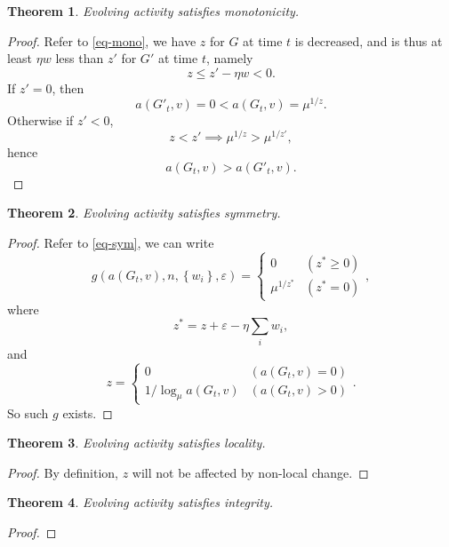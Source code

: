 \documentclass[12pt,abstract=true]{scrartcl}
\numberwithin{equation}{section}
\theoremstyle{definition}   \newtheorem{definition}{Definition}[section]
\theoremstyle{plain}        \newtheorem{theorem}{Theorem}[section]
\theoremstyle{plain}        \newtheorem{observation}{Observation}[section]
\theoremstyle{plain}        \newtheorem{fact}{Fact}[section]
\theoremstyle{plain}        \newtheorem{claim}{Claim}[section]
\theoremstyle{plain}        \newtheorem{lemma}[theorem]{Lemma}
\theoremstyle{plain}        \newtheorem{corollary}[theorem]{Corollary}
\theoremstyle{remark}       \newtheorem{example}{Example}[section]
\theoremstyle{remark}       \newtheorem{remark}{Remark}[section]
\begin{document}
\begin{theorem}
Evolving activity satisfies monotonicity.
\end{theorem}
\begin{proof}
Refer to \eqref{eq-mono}, we have $z$ for $G$ at time $t$ is decreased, and
is thus at least $\eta w$ less than $z'$ for $G'$ at time $t$, namely
\begin{equation}z\leq z'-\eta w<0.\end{equation}
If $z'=0$, then
\begin{equation}
a(G'_t,v)=0<a(G_t,v)=\mu^{1/z}.
\end{equation}
Otherwise if $z'<0$,
\begin{equation}
z<z'\implies \mu^{1/z}>\mu^{1/z'},
\end{equation}
hence
\begin{equation}
a(G_t,v)>a(G'_t,v).
\end{equation}
\end{proof}

\begin{theorem}
Evolving activity satisfies symmetry.
\end{theorem}
\begin{proof}
Refer to \eqref{eq-sym}, we can write
\begin{equation}
g(a(G_t,v),n,\left\{w_i\right\},\varepsilon)=\begin{cases}
0 &(z^*\geq 0)\\
\mu^{1/z^*}& (z^*=0)
\end{cases},
\end{equation}
where
\begin{equation}
z^*=z+\varepsilon-\eta \sum_i w_i,
\end{equation}
and
\begin{equation}
z=\begin{cases}
0&(a(G_t,v)=0)\\
1/\log_{\mu}a(G_t,v)&(a(G_t,v)>0)
\end{cases}.
\end{equation}
So such $g$ exists.
\end{proof}

\begin{theorem}
Evolving activity satisfies locality.
\end{theorem}
\begin{proof}
By definition, $z$ will not be affected by non-local change.
\end{proof}

\begin{theorem}
Evolving activity satisfies integrity.
\end{theorem}
\begin{proof}
\end{proof}
\end{document}
